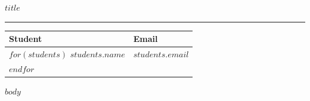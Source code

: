 \documentclass[11pt,a4paper]{article}
\begin{document}
 
\begin{titlepage}
\thispagestyle{empty}
\vspace*{2cm}
 
\noindent
{\Huge\bfseries $title$ \par}
 
\vspace{0.3cm}
\noindent\textcolor{linecolor}{\rule{\textwidth}{0.5pt}}
 
\vspace{1cm}
 
\vspace{0.8cm}
 
\vspace{1.5cm}
 
\vspace{0.5cm}
\noindent
\renewcommand{\arraystretch}{1.4}
\begin{tabularx}{\textwidth}{|>{\centering\arraybackslash}X|>{\centering\arraybackslash}X|}
\hline
\rowcolor{headerbg}
\textbf{Student} & \textbf{Email} \\
\hline
$for(students)$
$students.name$ & $students.email$ \\
\hline
$endfor$
\end{tabularx}
 
\vfill
\end{titlepage}
 
\tableofcontents
\newpage
 
$body$
 
\end{document}

